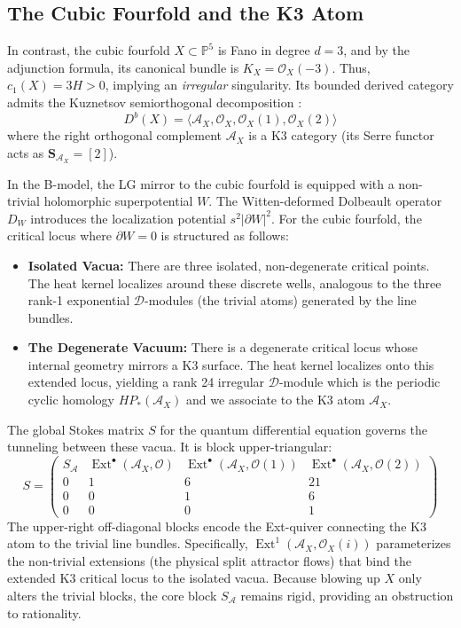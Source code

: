 \documentclass[12pt,reqno]{amsart}
\theoremstyle{remark} \newtheorem{remark}[theorem]{Remark}
\begin{document}
\subsection{The Cubic Fourfold and the K3 Atom}
In contrast, the cubic fourfold $X \subset \mathbb{P}^5$ is Fano in
degree $d=3$, and by the adjunction formula, its canonical bundle is
$K_X = \mathcal{O}_X(-3)$. Thus, $c_1(X) = 3H > 0$, implying an {\em
  irregular} singularity. Its bounded derived category admits the
Kuznetsov semiorthogonal decomposition \cite{Kuznetsov2010}:
\begin{equation}
    D^b(X) = \langle \mathcal{A}_X, \mathcal{O}_X, \mathcal{O}_X(1),
    \mathcal{O}_X(2) \rangle
\end{equation}
where the right orthogonal complement $\mathcal{A}_X$ is a K3 category
(its Serre functor acts as $\mathbf{S}_{\mathcal{A}_X} = [2]$).

In the B-model, the LG mirror to the cubic fourfold is equipped with a
non-trivial holomorphic superpotential $W$. The Witten-deformed
Dolbeault operator $D_W$ introduces the localization potential
$s^2|\partial W|^2$. For the cubic fourfold, the critical locus where
$\partial W = 0$ is structured as follows:
\begin{itemize}
    \item \textbf{Isolated Vacua:} There are three isolated,
      non-degenerate critical points. The heat kernel localizes around
      these discrete wells, analogous to the three rank-1 exponential
      $\mathcal{D}$-modules (the trivial atoms) generated by the line
      bundles.
    \item \textbf{The Degenerate Vacuum:} There is a degenerate
      critical locus whose internal geometry mirrors a K3 surface. The
      heat kernel localizes onto this extended locus, yielding a rank
      24 irregular $\mathcal{D}$-module which is the periodic cyclic
      homology $HP_*(\mathcal{A}_X)$ and we associate to the K3 atom
      $\mathcal{A}_X$.
\end{itemize}

The global Stokes matrix $S$ for the quantum differential equation
governs the tunneling between these vacua. It is block
upper-triangular:
\begin{equation}
    S = \begin{pmatrix} S_{\mathcal{A}} &
      \operatorname{Ext}^\bullet(\mathcal{A}_X, \mathcal{O}) &
      \operatorname{Ext}^\bullet(\mathcal{A}_X, \mathcal{O}(1)) &
      \operatorname{Ext}^\bullet(\mathcal{A}_X, \mathcal{O}(2)) \\ 0 &
      1 & 6 & 21 \\ 0 & 0 & 1 & 6 \\ 0 & 0 & 0 & 1
    \end{pmatrix}
\end{equation}
The upper-right off-diagonal blocks encode the Ext-quiver connecting
the K3 atom to the trivial line bundles. Specifically,
$\operatorname{Ext}^1(\mathcal{A}_X,\mathcal{O}_X(i))$ parameterizes
the non-trivial extensions (the physical split attractor flows) that
bind the extended K3 critical locus to the isolated vacua. Because
blowing up $X$ only alters the trivial blocks, the core block
$S_{\mathcal{A}}$ remains rigid, providing an obstruction to
rationality.
\end{document}
